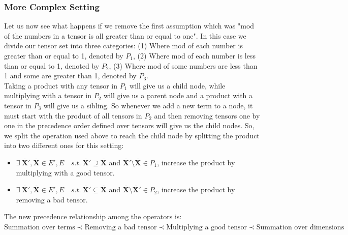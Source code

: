 \documentclass{article}
\newcommand{\TX}{\textbf{X}\xspace}
\begin{document}
\subsubsection{More Complex Setting}
Let us now see what happens if we remove the first assumption which was "mod of the numbers in a tensor is all greater than or equal to one". In this case we divide our tensor set into three categories: (1) Where mod of each number is greater than or equal to 1, denoted by $P_1$, (2) Where mod of each number is less than or equal to 1, denoted by $P_2$, (3) Where mod of some numbers are less than 1 and some are greater than 1, denoted by $P_3$.
\\
Taking a product with any tensor in $P_1$ will give us a child node, while multiplying with a tensor in $P_2$ will give us a parent node and a product with a tensor in $P_3$ will give us a sibling.
So whenever we add a new term to a node, it must start with the product of all tensors in $P_2$ and then removing tensors one by one in the precedence order defined over tensors will give us the child nodes. So, we split the operation used above to reach the child node by splitting the product into two different ones for this setting:
\begin{itemize}
\item $\exists \ \overline{\TX}',\overline{\TX} \in E',E \quad s.t. \  \overline{\TX}' \supseteq \overline{\TX}$ and $\overline{\TX}' \setminus \overline{\TX} \in P_1 $, increase the product by multiplying with a good tensor.
\item $\exists \ \overline{\TX}',\overline{\TX} \in E',E \quad s.t. \ \overline{\TX}' \subseteq \overline{\TX}$ and $\overline{\TX} \setminus \overline{\TX}' \in P_2$, increase the product by removing a bad tensor.
\end{itemize}
The new precedence relationship among the operators is:
$\text{Summation over terms} \prec \text{Removing a bad tensor} \prec \text{Multiplying a good tensor} \prec \text{Summation over dimensions}$
\end{document}
